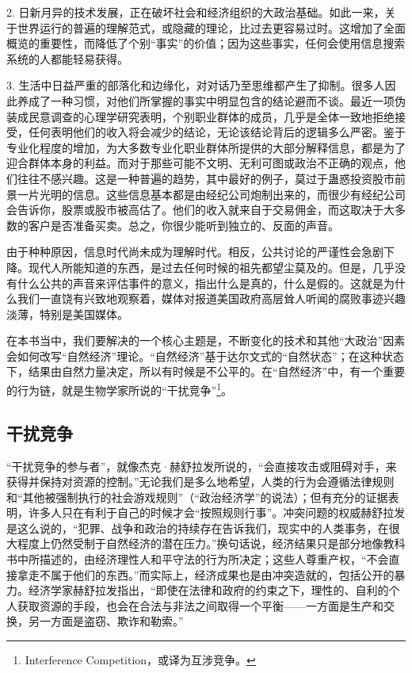 2. 日新月异的技术发展，正在破坏社会和经济组织的大政治基础。如此一来，关于世界运行的普遍的理解范式，或隐藏的理论，比过去更容易过时。这增加了全面概览的重要性，而降低了个别“事实”的价值；因为这些事实，任何会使用信息搜索系统的人都能轻易获得。

3. 生活中日益严重的部落化和边缘化，对对话乃至思维都产生了抑制。很多人因此养成了一种习惯，对他们所掌握的事实中明显包含的结论避而不谈。最近一项伪装成民意调查的心理学研究表明，个别职业群体的成员，几乎是全体一致地拒绝接受，任何表明他们的收入将会减少的结论，无论该结论背后的逻辑多么严密。鉴于专业化程度的增加，为大多数专业化职业群体所提供的大部分解释信息，都是为了迎合群体本身的利益。而对于那些可能不文明、无利可图或政治不正确的观点，他们往往不感兴趣。这是一种普遍的趋势，其中最好的例子，莫过于蛊惑投资股市前景一片光明的信息。这些信息基本都是由经纪公司炮制出来的，而很少有经纪公司会告诉你，股票或股市被高估了。他们的收入就来自于交易佣金，而这取决于大多数的客户是否准备买卖。总之，你很少能听到独立的、反面的声音。

由于种种原因，信息时代尚未成为理解时代。相反，公共讨论的严谨性会急剧下降。现代人所能知道的东西，是过去任何时候的祖先都望尘莫及的。但是，几乎没有什么公共的声音来评估事件的意义，指出什么是真的，什么是假的。这就是为什么我们一直饶有兴致地观察着，媒体对报道美国政府高层耸人听闻的腐败事迹兴趣淡薄，特别是美国媒体。

在本书当中，我们要解决的一个核心主题是，不断变化的技术和其他“大政治”因素会如何改写“自然经济”理论。“自然经济”基于达尔文式的“自然状态”；在这种状态下，结果由自然力量决定，所以有时候是不公平的。在“自然经济”中，有一个重要的行为链，就是生物学家所说的“干扰竞争”\footnote{Interference Competition，或译为互涉竞争。}。

\subsection{干扰竞争}
“干扰竞争的参与者”，就像杰克·赫舒拉发所说的，“会直接攻击或阻碍对手，来获得并保持对资源的控制。”无论我们是多么地希望，人类的行为会遵循法律规则和“其他被强制执行的社会游戏规则”（“政治经济学”的说法）；但有充分的证据表明，许多人只在有利于自己的时候才会“按照规则行事”。冲突问题的权威赫舒拉发是这么说的，“犯罪、战争和政治的持续存在告诉我们，现实中的人类事务，在很大程度上仍然受制于自然经济的潜在压力。”换句话说，经济结果只是部分地像教科书中所描述的，由经济理性人和平守法的行为所决定；这些人尊重产权，“不会直接拿走不属于他们的东西。”而实际上，经济成果也是由冲突造就的，包括公开的暴力。经济学家赫舒拉发指出，“即使在法律和政府的约束之下，理性的、自利的个人获取资源的手段，也会在合法与非法之间取得一个平衡——一方面是生产和交换，另一方面是盗窃、欺诈和勒索。”

